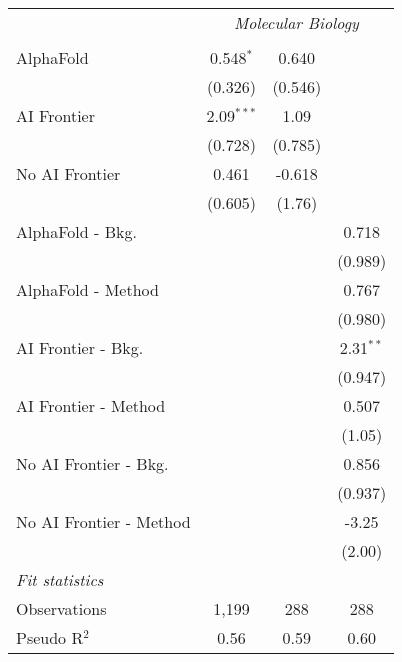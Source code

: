 \begin{tabular}{lccc}
 & \multicolumn{3}{c}{\textit{Molecular Biology}} \\ \\
   AlphaFold               & 0.548$^{*}$  & 0.640   &   \\   
                           & (0.326)      & (0.546) &   \\   
   AI Frontier             & 2.09$^{***}$ & 1.09    &   \\   
                           & (0.728)      & (0.785) &   \\   
   No AI Frontier          & 0.461        & -0.618  &   \\   
                           & (0.605)      & (1.76)  &   \\   
   AlphaFold - Bkg.        &              &         & 0.718\\   
                           &              &         & (0.989)\\   
   AlphaFold - Method      &              &         & 0.767\\   
                           &              &         & (0.980)\\   
   AI Frontier - Bkg.      &              &         & 2.31$^{**}$\\   
                           &              &         & (0.947)\\   
   AI Frontier - Method    &              &         & 0.507\\   
                           &              &         & (1.05)\\   
   No AI Frontier - Bkg.   &              &         & 0.856\\   
                           &              &         & (0.937)\\   
   No AI Frontier - Method &              &         & -3.25\\   
                           &              &         & (2.00)\\   
   \midrule
   \emph{Fit statistics}\\
   Observations            & 1,199        & 288     & 288\\  
   Pseudo R$^2$            & 0.56         & 0.59    & 0.60\\  
   

\end{tabular}
